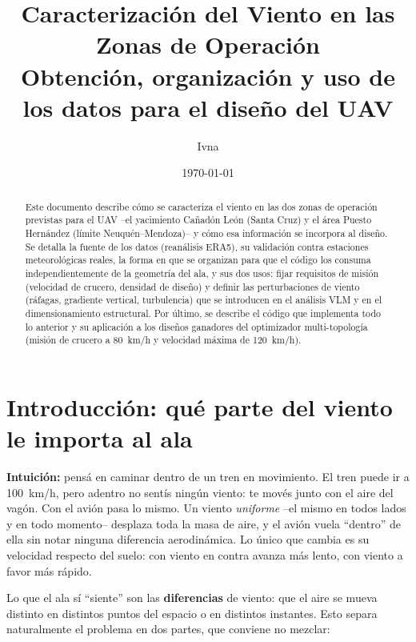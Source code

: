 \documentclass[11pt]{article}
\title{Caracterización del Viento en las Zonas de Operación\\
\large Obtención, organización y uso de los datos para el diseño del UAV}
\author{Ivna}
\date{\today}
\begin{document}
\shorthandoff{<>}

\maketitle

\begin{abstract}
Este documento describe cómo se caracteriza el viento en las dos zonas de
operación previstas para el UAV --el yacimiento Cañadón León (Santa Cruz) y
el área Puesto Hernández (límite Neuquén--Mendoza)-- y cómo esa información se
incorpora al diseño. Se detalla la fuente de los datos (reanálisis ERA5), su
validación contra estaciones meteorológicas reales, la forma en que se
organizan para que el código los consuma independientemente de la geometría
del ala, y sus dos usos: fijar requisitos de misión (velocidad de crucero,
densidad de diseño) y definir las perturbaciones de viento (ráfagas,
gradiente vertical, turbulencia) que se introducen en el análisis VLM y en el
dimensionamiento estructural. Por último, se describe el código que implementa
todo lo anterior y su aplicación a los diseños ganadores del optimizador
multi-topología (misión de crucero a 80~km/h y velocidad máxima de 120~km/h).
\end{abstract}

\tableofcontents

\section{Introducción: qué parte del viento le importa al ala}
\label{sec:intro}

\textbf{Intuición:} pensá en caminar dentro de un tren en movimiento. El tren
puede ir a 100~km/h, pero adentro no sentís ningún viento: te movés junto con
el aire del vagón. Con el avión pasa lo mismo. Un viento \emph{uniforme} --el
mismo en todos lados y en todo momento-- desplaza toda la masa de aire, y el
avión vuela ``dentro'' de ella sin notar ninguna diferencia aerodinámica. Lo
único que cambia es su velocidad respecto del suelo: con viento en contra
avanza más lento, con viento a favor más rápido.

Lo que el ala sí ``siente'' son las \textbf{diferencias} de viento: que el
aire se mueva distinto en distintos puntos del espacio o en distintos
instantes. Esto separa naturalmente el problema en dos partes, que conviene
no mezclar:
\end{document}
